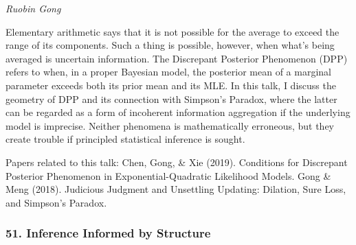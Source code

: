 \begin{itemize}
\emph{\footnotesize Ruobin Gong}

Elementary arithmetic says that it is not possible for the average to exceed the range of its components. Such a thing is possible, however, when what's being averaged is uncertain information. The Discrepant Posterior Phenomenon (DPP) refers to when, in a proper Bayesian model, the posterior mean of a marginal parameter exceeds both its prior mean and its MLE.  In this talk, I discuss the geometry of DPP and its connection with Simpson’s Paradox, where the latter can be regarded as a form of incoherent information aggregation if the underlying model is imprecise. Neither phenomena is mathematically erroneous, but they create trouble if principled statistical inference is sought.

Papers related to this talk:
Chen, Gong, \& Xie (2019). Conditions for Discrepant Posterior Phenomenon in Exponential-Quadratic Likelihood Models.
Gong \& Meng (2018). Judicious Judgment and Unsettling Updating: Dilation, Sure Loss, and Simpson’s Paradox.

\end{itemize}

\subsubsection*{51. Inference Informed by Structure}

